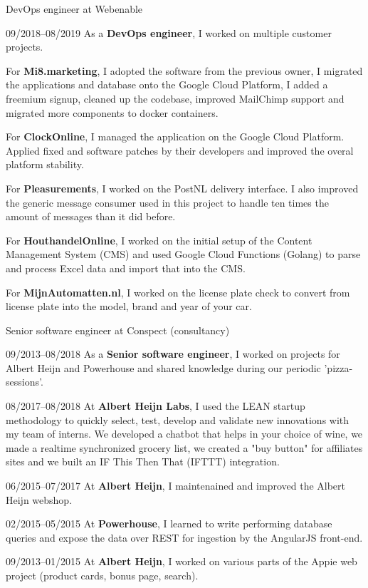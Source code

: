 \documentclass[11pt,a4paper]{article}
\begin{document}
\begin{cv}{}
	\begin{cvlist}{DevOps engineer at Webenable}
		\item[09/2018--08/2019] As a \textbf{DevOps engineer}, I worked on multiple
		customer projects.
		
		For \textbf{Mi8.marketing}, I adopted the software from the previous owner,
		I migrated the applications and database onto the Google Cloud Platform, I
		added a freemium signup, cleaned up the codebase, improved MailChimp
		support and migrated more components to docker containers.

		For \textbf{ClockOnline}, I managed the application on the Google Cloud
		Platform. Applied fixed and software patches by their developers and
		improved the overal platform stability.

		For \textbf{Pleasurements}, I worked on the PostNL delivery interface. I
		also improved the generic message consumer used in this project to handle
		ten times the amount of messages than it did before.

		For \textbf{HouthandelOnline}, I worked on the initial setup of the Content
		Management System (CMS) and used Google Cloud Functions (Golang) to parse
		and process Excel data and import that into the CMS.

		For \textbf{MijnAutomatten.nl}, I worked on the license plate check to
		convert from license plate into the model, brand and year of your car.
	\end{cvlist}

	\begin{cvlist}{Senior software engineer at Conspect (consultancy)}
		\item[09/2013--08/2018] As a \textbf{Senior software engineer}, I worked on
		projects for Albert Heijn and Powerhouse and shared knowledge during our
		periodic 'pizza-sessions'.
		\item[\color{gray}08/2017--08/2018] At \textbf{Albert Heijn Labs}, I used
		the LEAN startup methodology to quickly select, test, develop and validate
		new innovations with my team of interns. We developed a chatbot that helps
		in your choice of wine, we made a realtime synchronized grocery list, we
		created a "buy button" for affiliates sites and we built an IF This Then
		That (IFTTT) integration.
		\item[\color{gray}06/2015--07/2017] At \textbf{Albert Heijn}, I
		maintenained and improved the Albert Heijn webshop.
		\item[\color{gray}02/2015--05/2015] At \textbf{Powerhouse}, I learned to
		write performing database queries and expose the data over REST for
		ingestion by the AngularJS front-end.
		\item[\color{gray}09/2013--01/2015] At \textbf{Albert Heijn}, I worked on
		various parts of the Appie web project (product cards, bonus page, search).
	\end{cvlist}


\end{cv}
\end{document}
